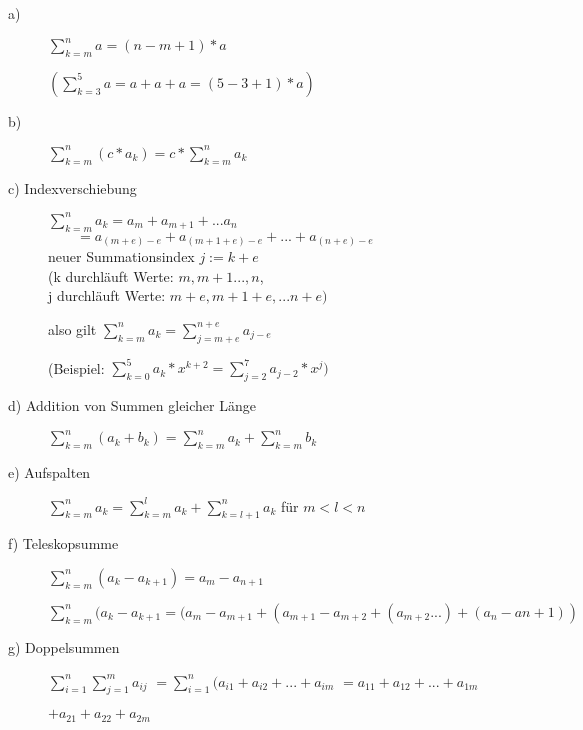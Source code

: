 \documentclass[a4paper, 12pt, twoside] {article}
\begin{document}
\begin{description}
	\item[a)] \hfill

	$\sum_{k=m}^{n} a = (n - m+ 1) * a$

	$(\sum_{k=3}^{5} a = a + a + a = (5-3+1)*a)$

	\item[b)] \hfill

	$\sum_{k=m}^{n} (c * a_k) = c * \sum_{k=m}^{n} a_k$

	\item[c) Indexverschiebung] \hfill

	$\sum_{k=m}^{n} a_k = a_m + a_{m+1} + ... a_n$ \\
	$\qquad = a_{(m + e) - e} + a_{(m+1+e)-e} + ... + a_{(n+e)-e}$ \\
	neuer Summationsindex $j := k +e$ \\
	(k durchläuft Werte: $m, m+1 ..., n$, \\
	j durchläuft Werte: $m + e, m+1+e, ... n+e)$

	also gilt
	$\sum_{k=m}^{n} a_k = \sum_{j = m+e}^{n+e} a_{j-e}$

	(Beispiel:
	$\sum_{k=0}^{5} a_k * x^{k+2} = \sum_{j = 2}^{7} a_{j-2} * x^j)$

	\item[d) Addition von Summen gleicher Länge] \hfill

	$\sum_{k=m}^{n} (a_k + b_k) = \sum_{k=m}^{n} a_k + \sum_{k=m}^{n} b_k$

	\item[e) Aufspalten] \hfill

	$\sum_{k=m}^{n} a_k = \sum_{k=m}^{l} a_k + \sum_{k=l+1}^{n} a_k$ für  $m < l < n$

	\item[f) Teleskopsumme] \hfill

	$\sum_{k=m}^{n} (a_k - a_{k+1}) = a_m - a_{n+1}$

	$\sum_{k=m}^{n} (a_k - a_{k+1} = (a_m - a_{m+1} + (a_{m+1} - a_{m+2} + (a_{m+2} ... ) + (a_n - a{n+1}))$ %

	\item[g) Doppelsummen] \hfill

	$\sum_{i=1}^{n} \sum_{j=1}^{m} a_{ij}$
	$= \sum_{i=1}^{n} (a_{i1} + a_{i2} + ... + a_{im}$
	$= a_{11} + a_{12} + ... + a_{1m}$ %

	$+ a_{21} + a_{22} + a_{2m}$

\end{description}
\end{document}
